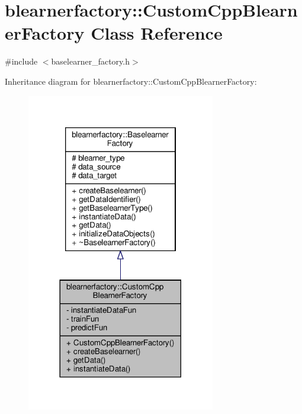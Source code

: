 \hypertarget{classblearnerfactory_1_1_custom_cpp_blearner_factory}{}\section{blearnerfactory\+:\+:Custom\+Cpp\+Blearner\+Factory Class Reference}
\label{classblearnerfactory_1_1_custom_cpp_blearner_factory}


{\ttfamily \#include $<$baselearner\+\_\+factory.\+h$>$}



Inheritance diagram for blearnerfactory\+:\+:Custom\+Cpp\+Blearner\+Factory\+:
\nopagebreak
\begin{figure}[H]
\begin{center}
\leavevmode
\includegraphics[width=233pt]{classblearnerfactory_1_1_custom_cpp_blearner_factory__inherit__graph}
\end{center}
\end{figure}


